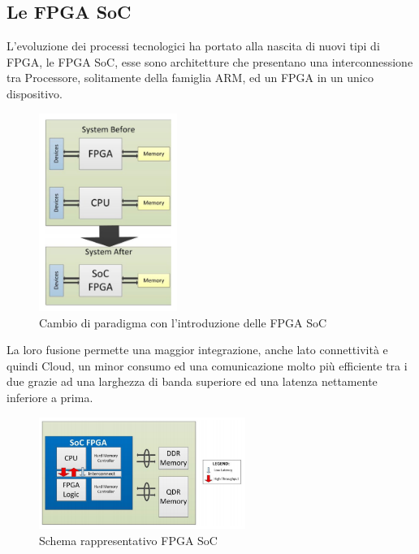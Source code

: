 \subsection{Le FPGA SoC}
L'evoluzione dei processi tecnologici ha portato alla nascita di nuovi tipi di FPGA, le FPGA SoC, esse sono architetture che presentano una interconnessione tra Processore, solitamente della famiglia ARM, ed un FPGA in un unico dispositivo.\clearpage
\begin{figure}[h]
\centering
\includegraphics[width=0.4\textwidth]{images/Capture1.png}
\caption{Cambio di paradigma con l'introduzione delle FPGA SoC}
\end{figure}
La loro fusione permette una maggior integrazione, anche lato connettività e quindi Cloud, un minor consumo ed una comunicazione molto più efficiente tra i due grazie ad una larghezza di banda superiore ed una latenza nettamente inferiore a prima.
\begin{figure}[h]
\centering
\includegraphics[width=0.6\textwidth]{images/Capture8.png}
\caption{Schema rappresentativo FPGA SoC}
\end{figure}\\
